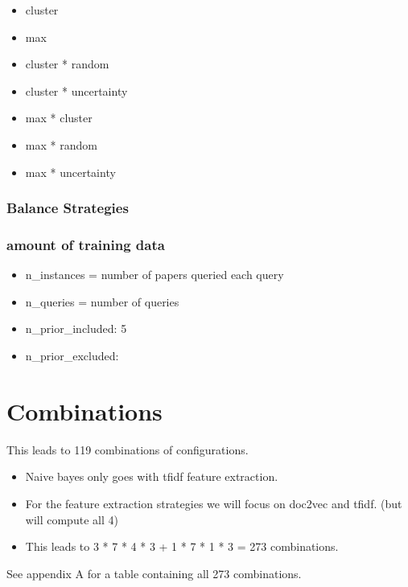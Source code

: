 \documentclass[
]{article}
\providecommand{\tightlist}{%
  \setlength{\itemsep}{0pt}\setlength{\parskip}{0pt}}
\begin{document}
\begin{itemize}
\tightlist
\item
  cluster
\item
  max
\item
  cluster * random
\item
  cluster * uncertainty
\item
  max * cluster
\item
  max * random
\item
  max * uncertainty
\end{itemize}

\hypertarget{balance-strategies}{%
\subsubsection{Balance Strategies}\label{balance-strategies}}

\hypertarget{amount-of-training-data}{%
\subsubsection{amount of training data}\label{amount-of-training-data}}

\begin{itemize}
\tightlist
\item
  n\_instances = number of papers queried each query
\item
  n\_queries = number of queries
\item
  n\_prior\_included: 5
\item
  n\_prior\_excluded:
\end{itemize}

\hypertarget{combinations}{%
\section{Combinations}\label{combinations}}

This leads to 119 combinations of configurations.

\begin{itemize}
\tightlist
\item
  Naive bayes only goes with tfidf feature extraction.
\item
  For the feature extraction strategies we will focus on doc2vec and
  tfidf. (but will compute all 4)
\item
  This leads to 3 * 7 * 4 * 3 + 1 * 7 * 1 * 3 = 273 combinations.
\end{itemize}

See appendix A for a table containing all 273 combinations.
\end{document}
